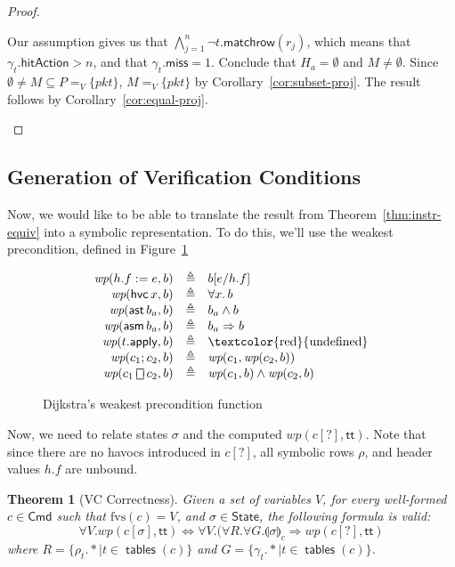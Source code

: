\documentclass{article}
\newcommand{\pkt}{\mathit{pkt}}
\newcommand{\TRUE}{\mathsf{tt}}
\newcommand{\Cmd}{\mathsf{Cmd}}
\newcommand{\State}{\mathsf{State}}
\newcommand{\hitAction}{\mathsf{hitAction}}
\newcommand{\miss}{\mathsf{miss}}
\newcommand{\assert}{\mathop{\mathsf{ast}}}
\newcommand{\assume}{\mathop{\mathsf{asm}}}
\newcommand{\apply}{\mathsf{apply}}
\newcommand{\choiceop}{\rotatebox[origin=c]{90}{$\sqsubset\!\!\!\sqsupset$}}
\newcommand{\choice}{\mathbin{\choiceop}}
\newcommand{\havoc}[1]{\mathop{\mathsf{hvc}}#1}
\newcommand{\WP}{\textit{wp}}
\newcommand{\state}[1]{\llparenthesis#1\rrparenthesis}
\newcommand{\instr}{[?]}
\newcommand{\fvs}{\textrm{fvs}}
\newcommand{\matchrow}{\mathsf{matchrow}}
\newcommand{\tables}{\mathop{\mathsf{tables}}}
\theoremstyle{plain}
\newtheorem{theorem}{Theorem}
\theoremstyle{definition}
\theoremstyle{remark}
\begin{document}
\begin{proof}
\begin{enumerate}[align=left]
\begin{enumerate}
        Our assumption gives us that $\bigwedge_{j=1}^n \neg t.\matchrow(r_j)$,
        which means that $\gamma_t.\hitAction > n$, and that $\gamma_t.\miss =
        1$. Conclude that $H_a = \emptyset$ and $M \neq \emptyset$. Since
        $\emptyset \neq M \subseteq P =_V \{\pkt\}$, $M =_V \{\pkt\}$ by
        Corollary~\ref{cor:subset-proj}. The result follows by
        Corollary~\ref{cor:equal-proj}.
    \end{enumerate}

  \end{enumerate}
\end{proof}

\subsection{Generation of Verification Conditions}

Now, we would like to be able to translate the result from
Theorem~\ref{thm:instr-equiv} into a symbolic representation. To do this, we'll
use the weakest precondition, defined in Figure~\ref{fig:wp}

\begin{figure}[H]
  \[
  \begin{array}{r >{\triangleq}c l}
    \WP(h.f := e, b)
    && b[e/h.f] \\
    \WP(\havoc x, b)
    && \forall x.\,b \\
    \WP(\assert b_a, b)
    && b_a \wedge b \\
    \WP(\assume b_a, b)
    && b_a \Rightarrow b \\
    \WP(t.\apply,b) && \textrm{\textcolor{red}{undefined}} \\
    \WP(c_1;c_2, b)
    && \WP(c_1,\WP(c_2,b)) \\
    \WP(c_1 \choice c_2, b)
    && \WP(c_1,b) \wedge \WP(c_2,b)
  \end{array}
  \]
  \caption{Dijkstra's weakest precondition function}
  \label{fig:wp}
\end{figure}

Now, we need to relate states $\sigma$ and the computed $\WP(c\instr,\TRUE)$.
Note that since there are no havocs introduced in $c\instr$, all symbolic rows
$\rho$, and header values $h.f$ are unbound.


\begin{theorem}[VC Correctness]
  \label{thm:vc-correct}
  Given a set of variables $V$, for every well-formed $c \in \Cmd$ such that $\fvs(c) = V$,
  and $\sigma \in \State$, the following formula is valid:
  \[ \forall V. \WP(c[\sigma], \TRUE) \iff \forall V. (\forall R. \forall G. \state\sigma_c \Rightarrow  \WP(c\instr,\TRUE)\]
  where $R = \{\rho_t.* \mid t \in \tables(c)\}$ and $G = \{\gamma_t.*\mid t \in \tables (c)\}$.
\end{theorem}
\end{document}

